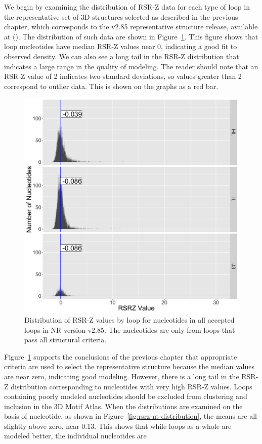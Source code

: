 We begin by examining the distribution of RSR-Z data for each type of loop in the
representative set of 3D structures selected as described in the previous
chapter, which corresponds to the v2.85 representative structure release,
available at (). The
distribution of such data are shown in Figure~\ref{fig:rsrz-distribution}. This
figure shows that loop nucleotides have median RSR-Z values near 0, indicating a
good fit to observed density. We can also see a long tail in the RSR-Z
distribution that indicates a large range in the quality of modeling. The reader
should note that an RSR-Z value of 2 indicates two standard deviations, so
values greater than 2 correspond to outlier data. This is shown on the graphs as
a red bar.

\begin{figure}
  \includegraphics[width=0.5\linewidth]{chapter-5/figs/loops/rsrz-distribution}
  \caption{Distribution of RSR-Z values by loop for nucleotides in all accepted
  loops in NR version v2.85. The nucleotides are only from loops that pass all
  structural criteria.}
\label{fig:rsrz-distribution}
\end{figure}

Figure~\ref{fig:rsrz-distribution} supports the conclusions of the previous
chapter that appropriate criteria are used to select the representative
structure because the median values are near zero, indicating good modeling.
However, there is a long tail in the RSR-Z distribution corresponding to
nucleotides with very high RSR-Z values. Loops containing poorly modeled
nucleotides should be excluded from clustering and inclusion in the 3D Motif
Atlas. When the distributions are examined on the basis of nucleotide, as shown
in Figure~\ref{fig:rsrz-nt-distribution}, the means are all slightly above zero,
near 0.13. This shows that while loops as a whole are modeled better, the
individual nucleotides are 

